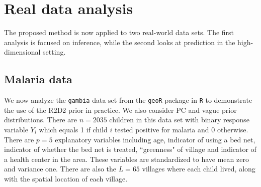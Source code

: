 \documentclass[12pt]{article}
\begin{document}



\section{Real data analysis}\label{s:app}

The proposed method is now applied to two real-world data sets. The first analysis is focused on inference, while the second looks at prediction in the high-dimensional setting.

\subsection{Malaria data}

We now analyze the {\tt gambia} data set \citep{thomson1999predicting} from the {\tt geoR} package \citep{ribeiro2007geor} in {\tt R} to demonstrate the use of the R2D2 prior in practice. We also consider PC and vague prior distributions. There are $n=2035$ children in this data set with binary response variable $Y_i$ which equals 1 if child $i$ tested positive for malaria and 0 otherwise. There are $p=5$ explanatory variables including age, indicator of using a bed net, indicator of whether the bed net is treated, ``greenness" of village and indicator of a health center in the area. These variables are standardized to have mean zero and variance one. There are also the $L=65$ villages where each child lived, along with the spatial location of each village.
\end{document}
